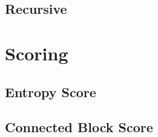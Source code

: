 		\subsection{Recursive}
			\clearpage
	
	\section{Scoring}
	
		\subsection{Entropy Score}
		
			\clearpage
		
		\subsection{Connected Block Score}
		
			\clearpage
